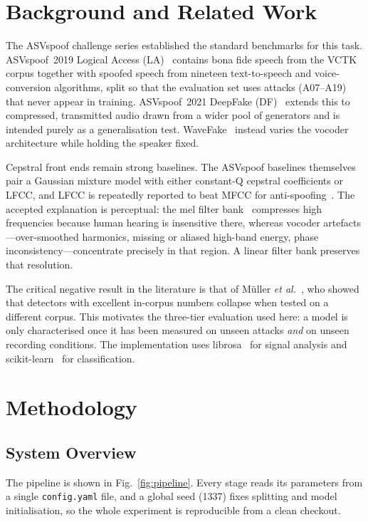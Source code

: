 \documentclass[journal,10pt]{IEEEtran}
\begin{document}
\section{Background and Related Work}
The ASVspoof challenge series established the standard benchmarks for this
task. ASVspoof~2019 Logical Access (LA)~\cite{todisco2019} contains bona
fide speech from the VCTK corpus together with spoofed speech from nineteen
text-to-speech and voice-conversion algorithms, split so that the evaluation
set uses attacks (A07--A19) that never appear in training.
ASVspoof~2021 DeepFake (DF)~\cite{yamagishi2021} extends this to compressed,
transmitted audio drawn from a wider pool of generators and is intended
purely as a generalisation test. WaveFake~\cite{frank2021} instead varies
the vocoder architecture while holding the speaker fixed.

Cepstral front ends remain strong baselines. The ASVspoof baselines
themselves pair a Gaussian mixture model with either constant-Q cepstral
coefficients or LFCC, and LFCC is repeatedly reported to beat MFCC for
anti-spoofing~\cite{sahidullah2015}. The accepted explanation is perceptual:
the mel filter bank~\cite{davis1980} compresses high frequencies because
human hearing is insensitive there, whereas vocoder artefacts---over-smoothed
harmonics, missing or aliased high-band energy, phase
inconsistency---concentrate precisely in that region. A linear filter bank
preserves that resolution.

The critical negative result in the literature is that of M\"uller
\emph{et al.}~\cite{muller2022}, who showed that detectors with excellent
in-corpus numbers collapse when tested on a different corpus. This motivates
the three-tier evaluation used here: a model is only characterised once it
has been measured on unseen attacks \emph{and} on unseen recording
conditions. The implementation uses librosa~\cite{mcfee2015} for signal
analysis and scikit-learn~\cite{pedregosa2011} for classification.

\section{Methodology}

\subsection{System Overview}
The pipeline is shown in Fig.~\ref{fig:pipeline}. Every stage reads its
parameters from a single \texttt{config.yaml} file, and a global seed
(1337) fixes splitting and model initialisation, so the whole experiment is
reproducible from a clean checkout.
\end{document}
